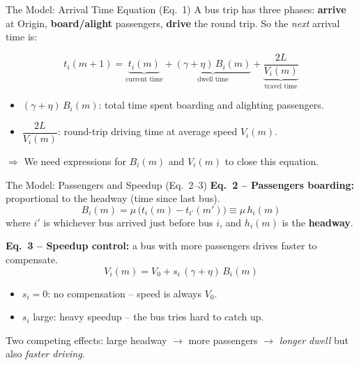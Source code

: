 \documentclass[t, aspectratio=169]{beamer}
\begin{document}
\begin{frame}{The Model: Arrival Time Equation (Eq.~1)}
	A bus trip has three phases: \textbf{arrive} at Origin, \textbf{board/alight} passengers, \textbf{drive} the round trip. So the \emph{next} arrival time is:

	\begin{equation}
		\boxed{\;t_i(m+1) = \underbrace{t_i(m)}_{\text{current time}}
		+ \underbrace{(\gamma + \eta)\,B_i(m)}_{\text{dwell time}}
		+ \underbrace{\frac{2L}{V_i(m)}}_{\text{travel time}}\;}
		\tag{Eq.\,1}
	\end{equation}

	\vspace{0.5em}
	\begin{itemize}
		\item $(\gamma+\eta)\,B_i(m)$: total time spent boarding and alighting passengers.
		\item $\dfrac{2L}{V_i(m)}$: round-trip driving time at average speed $V_i(m)$.
	\end{itemize}

	\vspace{0.3em}
	$\Rightarrow$ We need expressions for $B_i(m)$ and $V_i(m)$ to close this equation.
\end{frame}

\begin{frame}{The Model: Passengers and Speedup (Eq.~2--3)}
	\textbf{Eq.~2 -- Passengers boarding:} proportional to the headway (time since last bus).
	\begin{equation}
		B_i(m) = \mu\,\big(t_i(m) - t_{i'}(m')\big) \equiv \mu\, h_i(m)
		\tag{Eq.\,2}
	\end{equation}
	where $i'$ is whichever bus arrived just before bus $i$, and $h_i(m)$ is the \textbf{headway}.

	\vspace{0.8em}
	\textbf{Eq.~3 -- Speedup control:} a bus with more passengers drives faster to compensate.
	\begin{equation}
		V_i(m) = V_0 + s_i\,(\gamma+\eta)\,B_i(m)
		\tag{Eq.\,3}
	\end{equation}

	\begin{itemize}
		\item $s_i = 0$: no compensation -- speed is always $V_0$.
		\item $s_i$ large: heavy speedup -- the bus tries hard to catch up.
	\end{itemize}

	\vspace{0.3em}
	\alert{Two competing effects:} large headway $\to$ more passengers $\to$ \emph{longer dwell} but also \emph{faster driving}.
\end{frame}
\end{document}
